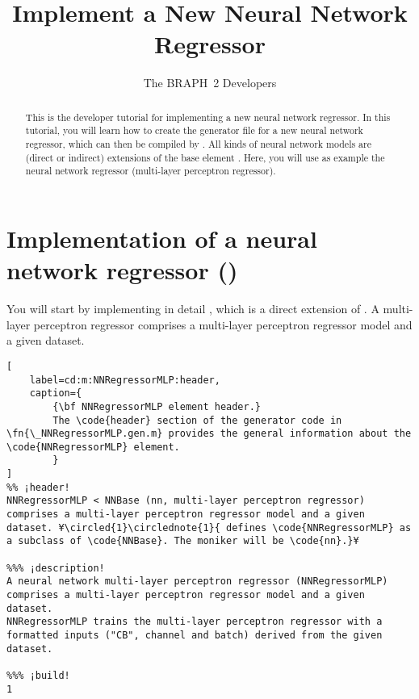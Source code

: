 \documentclass{tufte-handout}
\title{Implement a New Neural Network Regressor}
\author[The BRAPH~2 Developers]{The BRAPH~2 Developers}
\begin{document}
\maketitle

\begin{abstract}
\noindent
This is the developer tutorial for implementing a new neural network regressor. 
In this tutorial, you will learn how to create the generator file  for a new neural network regressor, which can then be compiled by . All kinds of neural network models are (direct or indirect) extensions of the base element . Here, you will use as example the neural network regressor  (multi-layer perceptron regressor).
\end{abstract}

\tableofcontents

\clearpage

\section{Implementation of a neural network regressor ()}

You will start by implementing in detail , which is a direct extension of .
A multi-layer perceptron regressor  comprises a multi-layer perceptron regressor model and a given dataset.

\begin{lstlisting}[
	label=cd:m:NNRegressorMLP:header,
	caption={
		{\bf NNRegressorMLP element header.}
		The \code{header} section of the generator code in \fn{\_NNRegressorMLP.gen.m} provides the general information about the \code{NNRegressorMLP} element.
		}
]
%% ¡header!
NNRegressorMLP < NNBase (nn, multi-layer perceptron regressor) comprises a multi-layer perceptron regressor model and a given dataset. ¥\circled{1}\circlednote{1}{ defines \code{NNRegressorMLP} as a subclass of \code{NNBase}. The moniker will be \code{nn}.}¥

%%% ¡description!
A neural network multi-layer perceptron regressor (NNRegressorMLP) comprises a multi-layer perceptron regressor model and a given dataset.
NNRegressorMLP trains the multi-layer perceptron regressor with a formatted inputs ("CB", channel and batch) derived from the given dataset.

%%% ¡build!
1
\end{lstlisting}
\end{document}
